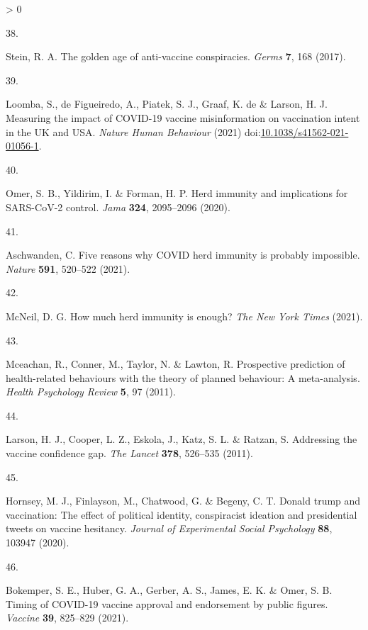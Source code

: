 \documentclass[
  12pt,
]{article}
\newlength{\cslhangindent}
\newlength{\csllabelwidth}
\newenvironment{CSLReferences}[2] %
 {%
  \setlength{\parindent}{0pt}
  \ifodd #1 \everypar{\setlength{\hangindent}{\cslhangindent}}\ignorespaces\fi
  \ifnum #2 > 0
  \setlength{\parskip}{#2\baselineskip}
  \fi
 }%
 {}
\newcommand{\CSLLeftMargin}[1]{\parbox[t]{\csllabelwidth}{#1}}
\newcommand{\CSLRightInline}[1]{\parbox[t]{\linewidth - \csllabelwidth}{#1}\break}
\begin{document}
\begin{CSLReferences}{0}{0}
\leavevmode\hypertarget{ref-stein2017golden}{}%
\CSLLeftMargin{38. }
\CSLRightInline{Stein, R. A. The golden age of anti-vaccine conspiracies. \emph{Germs} \textbf{7}, 168 (2017).}

\leavevmode\hypertarget{ref-loomba_measuring_2021}{}%
\CSLLeftMargin{39. }
\CSLRightInline{Loomba, S., de Figueiredo, A., Piatek, S. J., Graaf, K. de \& Larson, H. J. Measuring the impact of {COVID}-19 vaccine misinformation on vaccination intent in the {UK} and {USA}. \emph{Nature Human Behaviour} (2021) doi:\href{https://doi.org/10.1038/s41562-021-01056-1}{10.1038/s41562-021-01056-1}.}

\leavevmode\hypertarget{ref-omer2020herd}{}%
\CSLLeftMargin{40. }
\CSLRightInline{Omer, S. B., Yildirim, I. \& Forman, H. P. Herd immunity and implications for SARS-CoV-2 control. \emph{Jama} \textbf{324}, 2095--2096 (2020).}

\leavevmode\hypertarget{ref-aschwanden2021five}{}%
\CSLLeftMargin{41. }
\CSLRightInline{Aschwanden, C. Five reasons why COVID herd immunity is probably impossible. \emph{Nature} \textbf{591}, 520--522 (2021).}

\leavevmode\hypertarget{ref-mcneil_2021}{}%
\CSLLeftMargin{42. }
\CSLRightInline{McNeil, D. G. How much herd immunity is enough? \emph{The New York Times} (2021).}

\leavevmode\hypertarget{ref-mceachanetal2011}{}%
\CSLLeftMargin{43. }
\CSLRightInline{Mceachan, R., Conner, M., Taylor, N. \& Lawton, R. Prospective prediction of health-related behaviours with the theory of planned behaviour: A meta-analysis. \emph{Health Psychology Review} \textbf{5}, 97 (2011).}

\leavevmode\hypertarget{ref-larson2011addressing}{}%
\CSLLeftMargin{44. }
\CSLRightInline{Larson, H. J., Cooper, L. Z., Eskola, J., Katz, S. L. \& Ratzan, S. Addressing the vaccine confidence gap. \emph{The Lancet} \textbf{378}, 526--535 (2011).}

\leavevmode\hypertarget{ref-hornsey2020donald}{}%
\CSLLeftMargin{45. }
\CSLRightInline{Hornsey, M. J., Finlayson, M., Chatwood, G. \& Begeny, C. T. Donald trump and vaccination: The effect of political identity, conspiracist ideation and presidential tweets on vaccine hesitancy. \emph{Journal of Experimental Social Psychology} \textbf{88}, 103947 (2020).}

\leavevmode\hypertarget{ref-bokemper2021timing}{}%
\CSLLeftMargin{46. }
\CSLRightInline{Bokemper, S. E., Huber, G. A., Gerber, A. S., James, E. K. \& Omer, S. B. Timing of COVID-19 vaccine approval and endorsement by public figures. \emph{Vaccine} \textbf{39}, 825--829 (2021).}


\end{CSLReferences}
\end{document}
